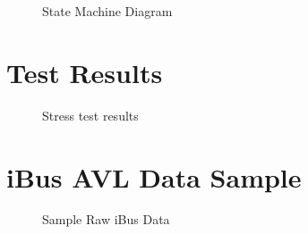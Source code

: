 \begin{figure}
	\caption{State Machine Diagram}
\label{fig:stateMachine}
\end{figure}

\FloatBarrier
\section{Test Results}
\begin{figure}[ht!]
	\caption{Stress test results}
\label{fig:stressTestResults}
\end{figure}

\FloatBarrier
\section{iBus AVL Data Sample}
\begin{figure}[ht!]
	\caption{Sample Raw iBus Data}
\label{fig:rawDataSample}
\end{figure}

